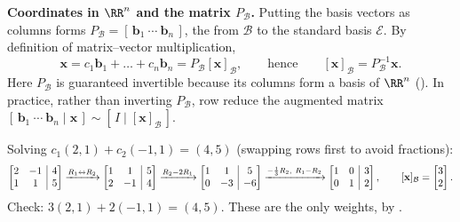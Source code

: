 \documentclass[10pt]{scrartcl}
\makeatletter
\newcommand{\aug}[2]{\left[\begin{array}{@{}#1@{}}#2\end{array}\right]}
\newcommand{\vv}[1]{\mathbf{#1}}
\makeatother
\begin{document}
\medskip\noindent\textbf{Coordinates in $\RR^n$ and the matrix $P_{\mathcal B}$.} Putting the basis vectors as columns forms $P_{\mathcal B}=[\,\vv b_1\ \cdots\ \vv b_n\,]$, the  from $\mathcal B$ to the standard basis $\mathcal E$. By definition of matrix--vector multiplication,
\[
  \vv x = c_1\vv b_1+\dots+c_n\vv b_n = P_{\mathcal B}[\vv x]_{\mathcal B},
  \qquad\text{hence}\qquad
  [\vv x]_{\mathcal B} = P_{\mathcal B}^{-1}\vv x.
\]
Here $P_{\mathcal B}$ is guaranteed invertible because its columns form a basis of $\RR^n$ (). In practice, rather than inverting $P_{\mathcal B}$, row reduce the augmented matrix $[\,\vv b_1\ \cdots\ \vv b_n\mid \vv x\,]\sim [\,I\mid [\vv x]_{\mathcal B}\,]$.

\revisit Solving $c_1(2,1)+c_2(-1,1)=(4,5)$ (swapping rows first to avoid fractions):
\[
  \aug{cc|c}{2&-1&4\\1&1&5}
  \xrightarrow{R_1\leftrightarrow R_2}
  \aug{cc|c}{1&1&5\\2&-1&4}
  \xrightarrow{R_2-2R_1}
  \aug{cc|c}{1&1&5\\0&-3&-6}
  \xrightarrow{-\frac13 R_2,\ R_1-R_2}
  \aug{cc|c}{1&0&3\\0&1&2},
  \qquad [\vv x]_{\mathcal B} = \begin{bmatrix}3\\2\end{bmatrix}.
\]
Check: $3(2,1)+2(-1,1)=(4,5)$. These are the only weights, by .
\end{document}
